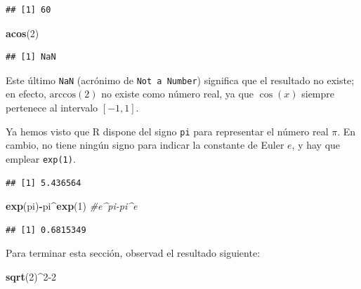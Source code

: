 \documentclass[]{book}
\newenvironment{Shaded}{\begin{snugshade}}{\end{snugshade}}
\newcommand{\CommentTok}[1]{\textcolor[rgb]{0.56,0.35,0.01}{\textit{#1}}}
\newcommand{\DecValTok}[1]{\textcolor[rgb]{0.00,0.00,0.81}{#1}}
\newcommand{\KeywordTok}[1]{\textcolor[rgb]{0.13,0.29,0.53}{\textbf{#1}}}
\newcommand{\NormalTok}[1]{#1}
\newcommand{\OperatorTok}[1]{\textcolor[rgb]{0.81,0.36,0.00}{\textbf{#1}}}
\theoremstyle{definition}
\theoremstyle{definition}
\theoremstyle{definition}
\theoremstyle{remark}
\begin{document}
\begin{verbatim}
## [1] 60
\end{verbatim}

\begin{Shaded}
\begin{Highlighting}[]
\KeywordTok{acos}\NormalTok{(}\DecValTok{2}\NormalTok{) }
\end{Highlighting}
\end{Shaded}

\begin{verbatim}
## [1] NaN
\end{verbatim}

Este último \texttt{NaN} (acrónimo de \texttt{Not\ a\ Number}) significa que el resultado no existe; en efecto, \(\mathrm{arccos}(2)\) no existe como número real, ya que \(\cos(x)\) siempre pertenece al intervalo \([-1,1]\).

Ya hemos visto que R dispone del signo \texttt{pi} para representar el número real \(\pi\). En cambio,
no tiene ningún signo para indicar la constante de Euler \(e\), y hay que emplear \texttt{exp(1)}.

\begin{Shaded}
\end{Shaded}

\begin{verbatim}
## [1] 5.436564
\end{verbatim}

\begin{Shaded}
\begin{Highlighting}[]
\KeywordTok{exp}\NormalTok{(pi)}\OperatorTok{-}\NormalTok{pi}\OperatorTok{^}\KeywordTok{exp}\NormalTok{(}\DecValTok{1}\NormalTok{) }\CommentTok{#e^pi-pi^e}
\end{Highlighting}
\end{Shaded}

\begin{verbatim}
## [1] 0.6815349
\end{verbatim}

Para terminar esta sección, observad el resultado siguiente:

\begin{Shaded}
\begin{Highlighting}[]
\KeywordTok{sqrt}\NormalTok{(}\DecValTok{2}\NormalTok{)}\OperatorTok{^}\DecValTok{2-2}
\end{Highlighting}
\end{Shaded}
\end{document}
